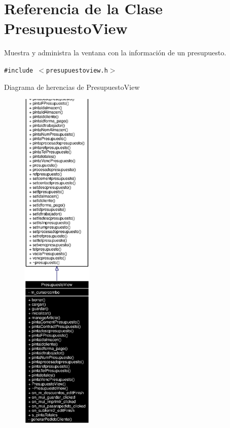 \section{Referencia de la Clase Presupuesto\-View}
\label{classPresupuestoView}
Muestra y administra la ventana con la informaci\'{o}n de un presupuesto.  


{\tt \#include $<$presupuestoview.h$>$}

Diagrama de herencias de Presupuesto\-View\begin{figure}[H]
\begin{center}
\leavevmode
\includegraphics[width=97pt]{classPresupuestoView__inherit__graph}
\end{center}
\end{figure}
